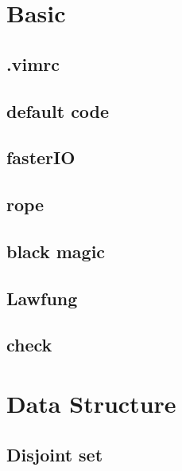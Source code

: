 \documentclass[a4paper,10pt,twocolumn,oneside]{article}
\begin{document}
\pagestyle{fancy}
\fancyfoot{}
\fancyhead[R]{\thepage}
\renewcommand{\headrulewidth}{0.4pt}
\renewcommand{\contentsname}{Contents} 

\scriptsize
\tableofcontents

\newpage

\section{Basic}
\subsection{.vimrc}


\subsection{default code}


\subsection{fasterIO}


\subsection{rope}


\subsection{black magic}


\subsection{Lawfung}


\subsection{check}


\section{Data Structure}
\subsection{Disjoint set}

\end{document}
